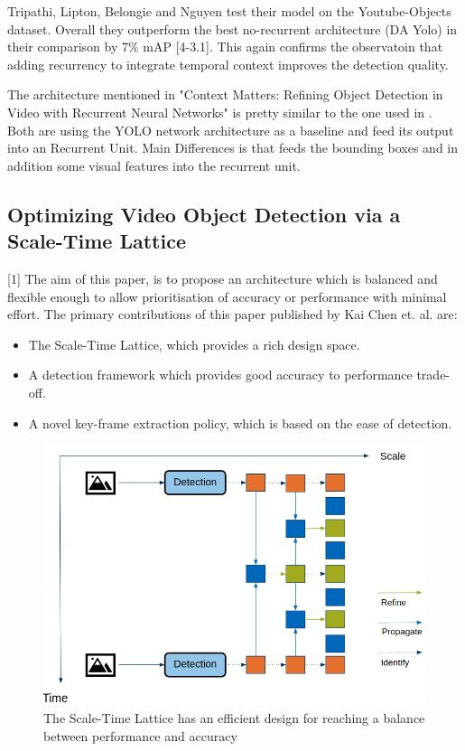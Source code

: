 \documentclass[conference]{IEEEtran}
\begin{document}
Tripathi, Lipton, Belongie and Nguyen test their model on the Youtube-Objects dataset. Overall they outperform the best no-recurrent architecture (DA Yolo) in their comparison by 7\% mAP [4-3.1]. This again confirms the observatoin that adding recurrency to integrate temporal context improves the detection quality.  \newline

The architecture mentioned in "Context Matters: Refining Object Detection in Video with Recurrent Neural Networks" is pretty similar to the one used in \cite{b4}. Both are using the YOLO network architecture as a baseline and feed its output into an Recurrent Unit. Main Differences is that \cite{b4} feeds the bounding boxes and in addition some visual features into the recurrent unit.  

\subsection{Optimizing Video Object Detection via a Scale-Time Lattice\cite{b10}}

[1] The aim of this paper, is to propose an architecture which is balanced and flexible enough to allow prioritisation of accuracy or performance with minimal effort. The primary contributions of this paper published by Kai Chen et. al. are:
\begin{itemize}
	\item The Scale-Time Lattice, which provides a rich design space.
	\item A detection framework which provides good accuracy to performance trade-off.
	\item A novel key-frame extraction policy, which is based on the ease of detection.
\end{itemize}

\begin{figure}[h]
\centering
\includegraphics[width=\columnwidth]{scale-time-lattice}
\caption{The Scale-Time Lattice has an efficient design for reaching a balance between performance and accuracy}
\end{figure}
\end{document}
